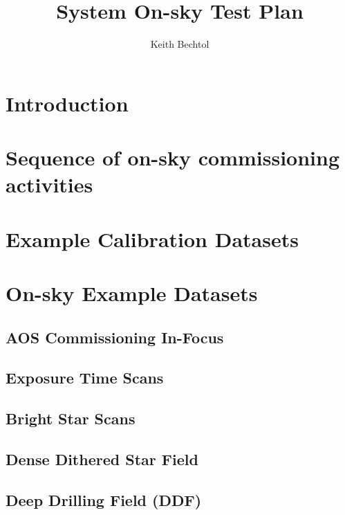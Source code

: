 \documentclass[SE,authoryear,toc]{lsstdoc}
\title{System On-sky Test Plan}
\author{%
Keith Bechtol
}
\date{\vcsDate}
\begin{document}
\maketitle


\section{Introduction}

\section{Sequence of on-sky commissioning activities}

\section{Example Calibration Datasets}

\section{On-sky Example Datasets}

\subsection{AOS Commissioning In-Focus}

\subsection{Exposure Time Scans}

\subsection{Bright Star Scans}

\subsection{Dense Dithered Star Field}



\subsection{Deep Drilling Field (DDF)}
\end{document}

